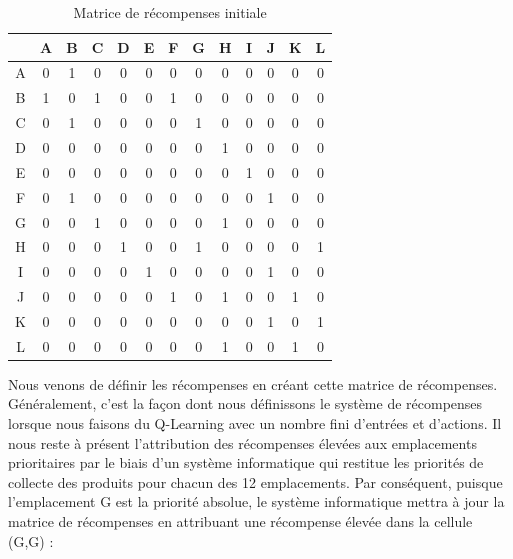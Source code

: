 \documentclass{article}
\begin{document}
\begin{table}[H]
    \centering
    \begin{tabular}{|c|c|c|c|c|c|c|c|c|c|c|c|c|}
        \hline
        & A & B & C & D & E & F & G & H & I & J & K & L \\
        \hline
        A & 0 & 1 & 0 & 0 & 0 & 0 & 0 & 0 & 0 & 0 & 0 & 0 \\
        B & 1 & 0 & 1 & 0 & 0 & 1 & 0 & 0 & 0 & 0 & 0 & 0 \\
        C & 0 & 1 & 0 & 0 & 0 & 0 & 1 & 0 & 0 & 0 & 0 & 0 \\
        D & 0 & 0 & 0 & 0 & 0 & 0 & 0 & 1 & 0 & 0 & 0 & 0 \\
        E & 0 & 0 & 0 & 0 & 0 & 0 & 0 & 0 & 1 & 0 & 0 & 0 \\
        F & 0 & 1 & 0 & 0 & 0 & 0 & 0 & 0 & 0 & 1 & 0 & 0 \\
        G & 0 & 0 & 1 & 0 & 0 & 0 & 0 & 1 & 0 & 0 & 0 & 0 \\
        H & 0 & 0 & 0 & 1 & 0 & 0 & 1 & 0 & 0 & 0 & 0 & 1 \\
        I & 0 & 0 & 0 & 0 & 1 & 0 & 0 & 0 & 0 & 1 & 0 & 0 \\
        J & 0 & 0 & 0 & 0 & 0 & 1 & 0 & 1 & 0 & 0 & 1 & 0 \\
        K & 0 & 0 & 0 & 0 & 0 & 0 & 0 & 0 & 0 & 1 & 0 & 1 \\
        L & 0 & 0 & 0 & 0 & 0 & 0 & 0 & 1 & 0 & 0 & 1 & 0 \\
        \hline
    \end{tabular}
    \caption{Matrice de récompenses initiale}
\end{table}
Nous venons de définir les récompenses en créant cette matrice de récompenses. Généralement, c'est la façon dont nous définissons le système de récompenses lorsque nous faisons du Q-Learning avec un nombre fini d'entrées et d'actions. Il nous reste à présent l'attribution des récompenses élevées aux emplacements prioritaires par le biais d'un système informatique qui restitue les priorités de collecte des produits pour chacun des 12 emplacements. Par conséquent, puisque l'emplacement G est la priorité absolue, le système informatique mettra à jour la matrice de récompenses en attribuant une récompense élevée dans la cellule (G,G) :
\end{document}
